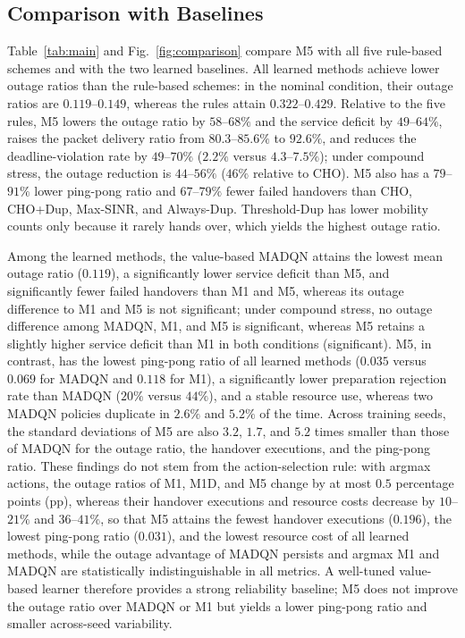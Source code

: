 \documentclass[journal]{IEEEtran}
\begin{document}
\subsection{Comparison with Baselines}
Table~\ref{tab:main} and Fig.~\ref{fig:comparison} compare M5 with all five
rule-based schemes and with the two learned baselines. All learned methods achieve lower outage ratios than the rule-based schemes:
in the nominal condition, their outage ratios are $0.119$--$0.149$, whereas the rules attain
$0.322$--$0.429$. Relative to the five rules, M5
lowers the outage ratio by $58$--$68\%$ and the service deficit by
$49$--$64\%$, raises the packet delivery ratio from $80.3$--$85.6\%$ to
$92.6\%$, and reduces the deadline-violation rate by $49$--$70\%$ ($2.2\%$ versus $4.3$--$7.5\%$); under compound stress, the outage reduction is
$44$--$56\%$ ($46\%$ relative to CHO). M5 also has a $79$--$91\%$ lower
ping-pong ratio and $67$--$79\%$ fewer failed handovers than CHO, CHO+Dup,
Max-SINR, and Always-Dup. Threshold-Dup has lower mobility counts only
because it rarely hands over, which yields the highest outage ratio.

Among the learned methods, the value-based MADQN attains the lowest mean
outage ratio ($0.119$), a significantly lower service deficit than M5, and
significantly fewer failed handovers than M1 and M5, whereas its outage difference to M1 and M5 is not significant; under compound
stress, no outage difference among MADQN, M1, and M5 is significant, whereas
M5 retains a slightly higher service deficit than M1 in both conditions
(significant). M5, in contrast, has the lowest ping-pong ratio of all learned methods ($0.035$
versus $0.069$ for MADQN and $0.118$ for M1), a significantly lower preparation
rejection rate than MADQN ($20\%$ versus $44\%$), and a stable resource use,
whereas two MADQN policies duplicate in $2.6\%$ and $5.2\%$ of the time. Across training seeds, the standard deviations of M5 are
also $3.2$, $1.7$, and $5.2$ times smaller than those of MADQN for the outage
ratio, the handover executions, and the ping-pong ratio. These findings
do not stem from the action-selection rule: with argmax actions, the outage
ratios of M1, M1D, and M5 change by at most $0.5$ percentage points (pp), whereas their handover
executions and resource costs decrease by $10$--$21\%$ and $36$--$41\%$, so
that M5 attains the fewest handover executions ($0.196$), the lowest ping-pong
ratio ($0.031$), and the lowest resource cost of all learned methods, while
the outage advantage of MADQN persists and argmax M1 and MADQN are
statistically indistinguishable in all metrics. A well-tuned value-based learner therefore provides a strong reliability
baseline; M5 does not improve the outage ratio over MADQN or M1 but yields a
lower ping-pong ratio and smaller across-seed variability.
\end{document}
